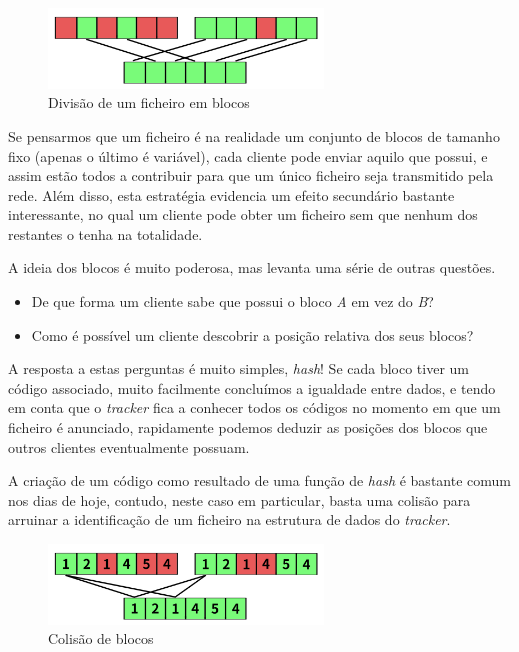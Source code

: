     
        \begin{figure}[hb!]
            \centering
            \includegraphics[width=0.65\textwidth]{Imagens/Blocos/blocos.png}
            \caption{Divisão de um ficheiro em blocos}
        \end{figure}
        \vspace{-10pt}

        Se pensarmos que um ficheiro é na realidade um conjunto de blocos de tamanho fixo (apenas o último é variável), cada cliente pode enviar aquilo que possui, e assim estão todos a contribuir para que um único ficheiro seja transmitido pela rede. Além disso, esta estratégia evidencia um efeito secundário bastante interessante, no qual um cliente pode obter um ficheiro sem que nenhum dos restantes o tenha na totalidade.

        A ideia dos blocos é muito poderosa, mas levanta uma série de outras questões.
        
        \begin{itemize}
            
            \item De que forma um cliente sabe que possui o bloco \textit{A} em vez do \textit{B}?  

            \item Como é possível um cliente descobrir a posição relativa dos seus blocos?
        \end{itemize}

        A resposta a estas perguntas é muito simples, \textit{hash}! Se cada bloco tiver um código associado, muito facilmente concluímos a igualdade entre dados, e tendo em conta que o \textit{tracker} fica a conhecer todos os códigos no momento em que um ficheiro é anunciado, rapidamente podemos deduzir as posições dos blocos que outros clientes eventualmente possuam.

        A criação de um código como resultado de uma função de \textit{hash} é bastante comum nos dias de hoje, contudo, neste caso em particular, basta uma colisão para arruinar a identificação de um ficheiro na estrutura de dados do \textit{tracker}.

        \begin{figure}[hb!]
            \centering
            \includegraphics[width=0.65\textwidth]{Imagens/Blocos/colisao de blocos.png}
            \caption{Colisão de blocos}
        \end{figure}
        \vspace{-10pt}

